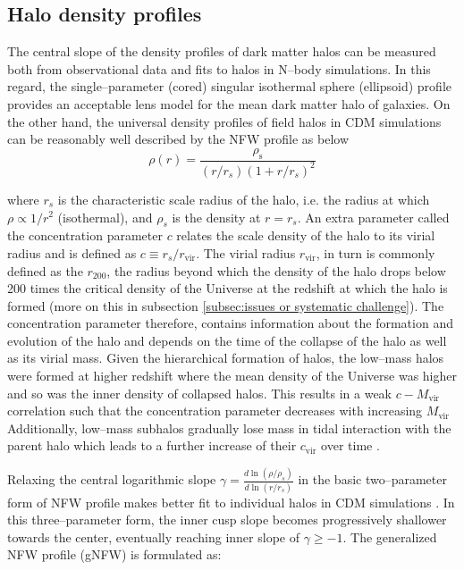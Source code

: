 \documentclass[a4wide,12pt]{book}
\begin{document}
{\subsection*{Halo density profiles}
The central slope of the density profiles of dark matter halos can be measured both from observational data and fits to halos in N--body simulations. In this regard, the single--parameter (cored) singular isothermal sphere (ellipsoid) profile provides an acceptable lens model for the mean dark matter halo of galaxies. On the other hand, the universal density profiles of field halos in CDM simulations can be reasonably well described by the NFW profile as below
\begin{equation}
\label{eq:NFW}
\rho(r)=\frac{\rho_\mathrm{s}}{(r/r_s)(1+r/r_s)^{2}}
\end{equation}

where $r_s$ is the characteristic scale radius of the halo, i.e. the radius at which $\rho \propto 1/r^2$ (isothermal), and $\rho_s$ is the density at $r=r_s$. An extra parameter called the concentration parameter $c$ relates the scale density of the halo to its virial radius and is defined as $c\equiv r_s/r_\mathrm{vir}$. The virial radius $r_\mathrm{vir}$, in turn is commonly defined as the $r_{200}$, the radius beyond which the density of the halo drops below 200 times the critical density of the Universe at the redshift at which the halo is formed (more on this in subsection \ref{subsec:issues or systematic challenge}). The concentration parameter therefore, contains information about the formation and evolution of the halo and depends on the time of the collapse of the halo as well as its virial mass. Given the hierarchical formation of halos, the low--mass halos were formed at higher redshift where the mean density of the Universe was higher and so was the inner density of collapsed halos. This results in a weak $c-M_\mathrm{vir}$ correlation such that the concentration parameter decreases with increasing $M_\mathrm{vir}$
  Additionally, low--mass subhalos gradually lose mass in tidal interaction with the parent halo which leads to a further increase of their $c_\mathrm{vir}$ over time \citep{Bullock+2001, Maccio2008}.

Relaxing the central logarithmic slope $\gamma = \frac{d\ln(\rho/\rho_s)}{d\ln(r/r_s)}$ in the basic two--parameter form of NFW profile makes better fit to individual halos in CDM simulations \citep[][]{}. %
 In this three--parameter form, the inner cusp slope becomes progressively shallower towards the center, eventually reaching inner slope of $\gamma\geq-1$. The generalized NFW profile (gNFW) is formulated as:

}
\end{document}

